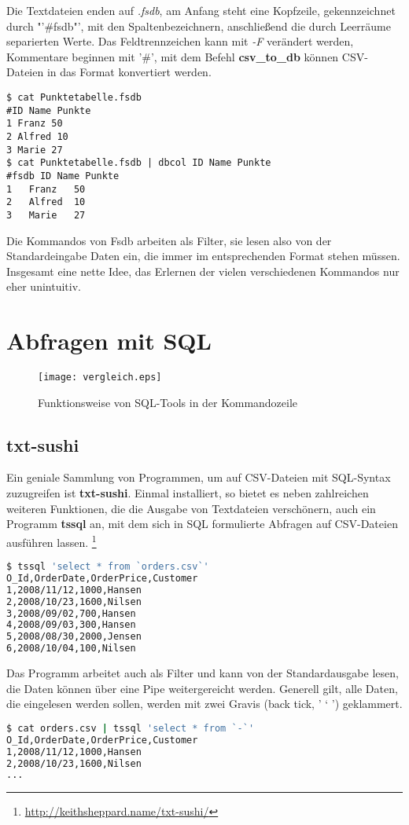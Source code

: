 Die Textdateien enden auf \textit{.fsdb}, am Anfang steht eine Kopfzeile, gekennzeichnet durch "'\#fsdb"', mit den Spaltenbezeichnern, anschließend die durch Leerräume separierten Werte.
Das Feldtrennzeichen kann mit \textit{-F} verändert werden, Kommentare beginnen mit '\#', mit dem Befehl \textbf{csv\_to\_db} können CSV-Dateien in das Format konvertiert werden.

\begin{lstlisting}
$ cat Punktetabelle.fsdb
#ID Name Punkte
1 Franz 50
2 Alfred 10
3 Marie 27
$ cat Punktetabelle.fsdb | dbcol ID Name Punkte
#fsdb ID Name Punkte
1	Franz	50
2	Alfred	10
3	Marie	27
\end{lstlisting}

Die Kommandos von Fsdb arbeiten als Filter, sie lesen also von der Standardeingabe Daten ein, die immer im entsprechenden Format stehen müssen. Insgesamt eine nette Idee, das Erlernen der vielen verschiedenen Kommandos nur eher unintuitiv.

\section{Abfragen mit SQL}

\begin{figure}
\centering
\texttt{[image: vergleich.eps]}
\caption{Funktionsweise von SQL-Tools in der Kommandozeile}
\label{fig:vergleich}
\end{figure}

\subsection{txt-sushi}
Ein geniale Sammlung von Programmen, um auf CSV-Dateien mit SQL-Syntax zuzugreifen ist \textbf{txt-sushi}. Einmal installiert, so bietet es neben zahlreichen weiteren Funktionen, die die Ausgabe von Textdateien verschönern, auch ein Programm \textbf{tssql} an, mit dem sich in SQL formulierte Abfragen auf CSV-Dateien ausführen lassen.
\footnote{\url{http://keithsheppard.name/txt-sushi/}}

\begin{lstlisting}[language=Bash]
$ tssql 'select * from `orders.csv`'
O_Id,OrderDate,OrderPrice,Customer
1,2008/11/12,1000,Hansen
2,2008/10/23,1600,Nilsen
3,2008/09/02,700,Hansen
4,2008/09/03,300,Hansen
5,2008/08/30,2000,Jensen
6,2008/10/04,100,Nilsen
\end{lstlisting}
Das Programm arbeitet auch als Filter und kann von der Standardausgabe lesen, die Daten können über eine Pipe weitergereicht werden. Generell gilt, alle Daten, die eingelesen werden sollen, werden mit zwei Gravis (back tick, ' ` ') geklammert.
\begin{lstlisting}[language=Bash]
$ cat orders.csv | tssql 'select * from `-`'
O_Id,OrderDate,OrderPrice,Customer
1,2008/11/12,1000,Hansen
2,2008/10/23,1600,Nilsen
...
\end{lstlisting}


